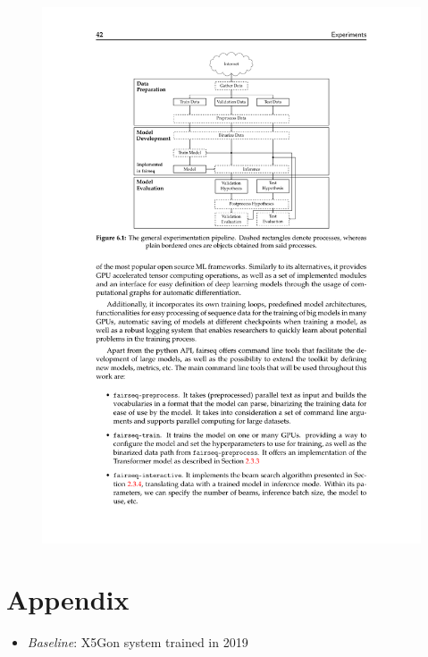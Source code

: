 \documentclass[landscape]{article}
\begin{document}
\begin{figure}[!htp]
\centering
\includegraphics[trim=5cm 17.2cm 5cm 2.5cm, scale=1.75, clip]{figures/experimental_setup}
\end{figure}


\cp
\thispagestyle{empty}
\section*{Appendix}
\vspace*{10mm}
\begin{itemize}
	\item \textit{Baseline}: X5Gon system trained in 2019
\end{itemize}
\vspace*{-10mm}
\end{document}
